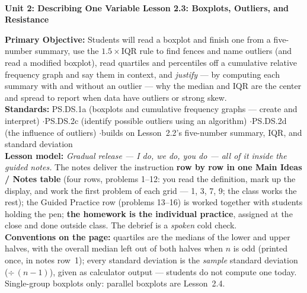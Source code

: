 \documentclass[10pt]{article}
\newcommand{\UnitNumberName}{Unit 2: Describing One Variable \quad}
\newcommand{\LessonNumberName}{Lesson 2.3: Boxplots, Outliers, and Resistance}
\begin{document}
\begin{center}
    {\Large\bfseries \CourseName \\
    {\small\bfseries \UnitNumberName \LessonNumberName}}
\end{center}

\begin{tcolorbox}[colback=frost, colframe=cerulean, boxrule=0.9pt, arc=2mm,
    left=2mm, right=2mm, top=1.5mm, bottom=1.5mm]
    \textbf{Primary Objective:} Students will read a boxplot and finish one from a five-number
    summary, use the $1.5 \times \text{IQR}$ rule to find fences and name outliers (and read a
    modified boxplot), read quartiles and percentiles off a cumulative relative frequency graph
    and say them in context, and \emph{justify} --- by computing each summary with and without
    an outlier --- why the median and IQR are the center and spread to report when data have
    outliers or strong skew.
    \\[2pt]
    \textbf{Standards:} PS.DS.1a (boxplots and cumulative frequency graphs --- create and
    interpret) \quad$\cdot$\quad PS.DS.2c (identify possible outliers using an algorithm)
    \quad$\cdot$\quad PS.DS.2d (the influence of outliers) \quad$\cdot$\quad builds on
    Lesson~2.2's five-number summary, IQR, and standard deviation
    \\[2pt]
    \textbf{Lesson model:} \emph{Gradual release --- I do, we do, you do --- all of it inside
    the guided notes.} The notes deliver the instruction \textbf{row by row in one Main Ideas /
    Notes table} (four rows, problems 1--12: you read the definition, mark up the display, and
    work the first problem of each grid --- 1, 3, 7, 9; the class works the rest); the Guided
    Practice row (problems 13--16) is worked together with students holding the pen;
    \textbf{the homework is the individual practice}, assigned at the close and done outside
    class. The debrief is a \emph{spoken} cold check.
    \\[2pt]
    \textbf{Conventions on the page:} quartiles are the medians of the lower and upper halves,
    with the overall median left out of both halves when $n$ is odd (printed once, in notes
    row~1); every standard deviation is the \emph{sample} standard deviation ($\div\,(n-1)$),
    given as calculator output --- students do not compute one today. Single-group boxplots
    only: parallel boxplots are Lesson~2.4.
\end{tcolorbox}
\end{document}
